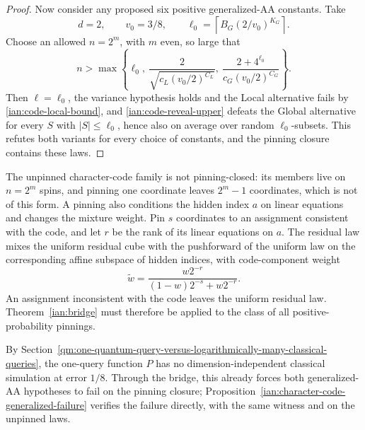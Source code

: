 \begin{proof}
Now consider any proposed six positive generalized-AA constants.
Take
\[
 d=2,\qquad v_0=3/8,\qquad
 \ell_0=\left\lceil B_G(2/v_0)^{K_G}\right\rceil .
\]
Choose an allowed \(n=2^m\), with \(m\) even, so large that
\[
 n>\max\left\{
 \ell_0,\
 \frac{2}{\sqrt{c_L(v_0/2)^{C_L}}},\
 \frac{2+4^{\ell_0}}{c_G(v_0/2)^{C_G}}
 \right\}.
\]
Then \(\ell=\ell_0\), the variance hypothesis holds and the Local
alternative fails by \eqref{ian:code-local-bound}, and
\eqref{ian:code-reveal-upper} defeats the Global alternative for every
\(S\) with \(|S|\le\ell_0\), hence also on average over random
\(\ell_0\)-subsets. This refutes both variants for every choice of
constants, and the pinning closure contains these laws.
\end{proof}

\begin{remark}
\label{ian:character-code-pinning}
The unpinned character-code family is not pinning-closed: its members
live on \(n=2^m\) spins, and pinning one coordinate leaves \(2^m-1\)
coordinates, which is not of this form. A pinning also
conditions the hidden index \(a\) on linear equations and changes the
mixture weight. Pin \(s\) coordinates to an assignment consistent with
the code, and let \(r\) be the rank of its linear equations on \(a\).
The residual law mixes the uniform residual cube with the pushforward
of the uniform law on the corresponding affine subspace of hidden
indices, with code-component weight
\[
 \widetilde w
 =\frac{w2^{-r}}{(1-w)2^{-s}+w2^{-r}}.
\]
An assignment inconsistent with the code leaves the uniform residual
law. Theorem~\ref{ian:bridge} must therefore be applied to the class of
all positive-probability pinnings.

By
Section~\ref{qm:one-quantum-query-versus-logarithmically-many-classical-queries},
the one-query function \(P\) has no dimension-independent classical
simulation at error \(1/8\). Through the bridge, this already forces
both generalized-AA hypotheses to fail on the pinning closure;
Proposition~\ref{ian:character-code-generalized-failure} verifies the
failure directly, with the same witness and on the unpinned laws.
\end{remark}
